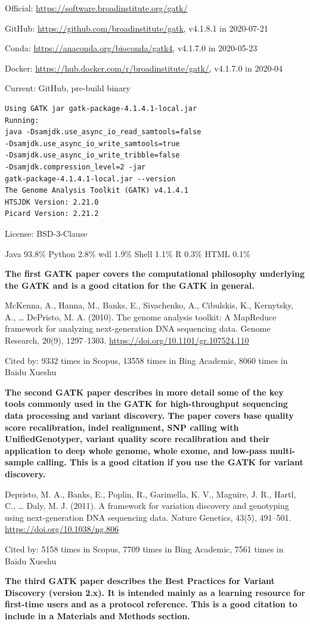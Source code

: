 \documentclass[]{article}
\newcommand{\cb}[3]{\par Cited by: {\color{blue}\Huge #1} times in Scopus, {\color{blue}\Huge #2} times in Bing Academic, {\color{blue}\Huge #3} times in Baidu Xueshu}
\begin{document}
Official: \url{https://software.broadinstitute.org/gatk/}

GitHub: \url{https://github.com/broadinstitute/gatk}, v4.1.8.1 in 2020-07-21

Conda: \url{https://anaconda.org/bioconda/gatk4}, v4.1.7.0 in 2020-05-23

Docker: \url{https://hub.docker.com/r/broadinstitute/gatk/}, v4.1.7.0 in 2020-04

Current: GitHub, pre-build binary

\begin{verbatim}
Using GATK jar gatk-package-4.1.4.1-local.jar
Running:
java -Dsamjdk.use_async_io_read_samtools=false
-Dsamjdk.use_async_io_write_samtools=true
-Dsamjdk.use_async_io_write_tribble=false
-Dsamjdk.compression_level=2 -jar 
gatk-package-4.1.4.1-local.jar --version
The Genome Analysis Toolkit (GATK) v4.1.4.1
HTSJDK Version: 2.21.0
Picard Version: 2.21.2
\end{verbatim}

License: BSD-3-Clause

Java 93.8\% Python 2.8\% wdl 1.9\% Shell 1.1\% R 0.3\% HTML 0.1\%

\textbf{The first GATK paper covers the computational philosophy underlying the GATK and is a good citation for the GATK in general.}

McKenna, A., Hanna, M., Banks, E., Sivachenko, A., Cibulskis, K., Kernytsky, A., … DePristo, M. A. (2010). The genome analysis toolkit: A MapReduce framework for analyzing next-generation DNA sequencing data. Genome Research, 20(9), 1297–1303. \url{https://doi.org/10.1101/gr.107524.110}\cb{9332}{13558}{8060}

\textbf{The second GATK paper describes in more detail some of the key tools commonly used in the GATK for high-throughput sequencing data processing and variant discovery. The paper covers base quality score recalibration, indel realignment, SNP calling with UnifiedGenotyper, variant quality score recalibration and their application to deep whole genome, whole exome, and low-pass multi-sample calling. This is a good citation if you use the GATK for variant discovery.}

Depristo, M. A., Banks, E., Poplin, R., Garimella, K. V., Maguire, J. R., Hartl, C., … Daly, M. J. (2011). A framework for variation discovery and genotyping using next-generation DNA sequencing data. Nature Genetics, 43(5), 491–501. \url{https://doi.org/10.1038/ng.806}\cb{5158}{7709}{7561}

\textbf{The third GATK paper describes the Best Practices for Variant Discovery (version 2.x). It is intended mainly as a learning resource for first-time users and as a protocol reference. This is a good citation to include in a Materials and Methods section.}
\end{document}
